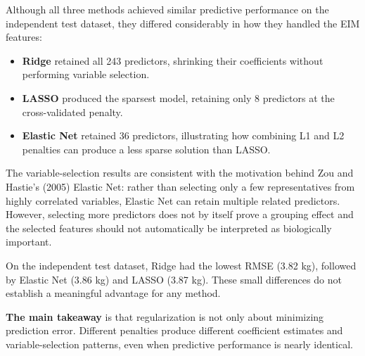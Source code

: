 \documentclass[
  letterpaper,
  DIV=11,
  numbers=noendperiod]{scrreprt}
\providecommand{\tightlist}{%
  \setlength{\itemsep}{0pt}\setlength{\parskip}{0pt}}
\begin{document}
Although all three methods achieved similar predictive performance on
the independent test dataset, they differed considerably in how they
handled the EIM features:

\begin{itemize}
\tightlist
\item
  \textbf{Ridge} retained all 243 predictors, shrinking their
  coefficients without performing variable selection.
\item
  \textbf{LASSO} produced the sparsest model, retaining only 8
  predictors at the cross-validated penalty.
\item
  \textbf{Elastic Net} retained 36 predictors, illustrating how
  combining L1 and L2 penalties can produce a less sparse solution than
  LASSO.
\end{itemize}

The variable-selection results are consistent with the motivation behind
Zou and Hastie's (2005) Elastic Net: rather than selecting only a few
representatives from highly correlated variables, Elastic Net can retain
multiple related predictors. However, selecting more predictors does not
by itself prove a grouping effect and the selected features should not
automatically be interpreted as biologically important.

On the independent test dataset, Ridge had the lowest RMSE (3.82 kg),
followed by Elastic Net (3.86 kg) and LASSO (3.87 kg). These small
differences do not establish a meaningful advantage for any method.

\textbf{The main takeaway} is that regularization is not only about
minimizing prediction error. Different penalties produce different
coefficient estimates and variable-selection patterns, even when
predictive performance is nearly identical.
\end{document}
